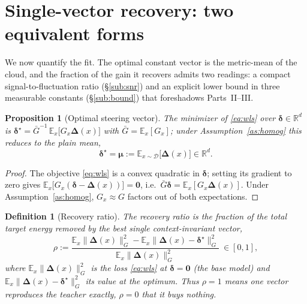\documentclass[11pt]{article}
\newtheorem{definition}{Definition}[section]
\newtheorem{proposition}{Proposition}[section]
\newcommand{\R}{\mathbb{R}}
\newcommand{\E}{\mathbb{E}}
\newcommand{\bdelta}{\bm{\delta}}
\newcommand{\bDelta}{\bm{\Delta}}
\newcommand{\bmu}{\bm{\mu}}
\newcommand{\Gnorm}[1]{\lVert #1\rVert_G}
\begin{document}
\section{Single-vector recovery: two equivalent forms}\label{sec:recovery}
We now quantify the fit. The optimal constant vector is the metric-mean of the cloud, and the
fraction of the gain it recovers admits two readings: a compact signal-to-fluctuation ratio
(\S\ref{sub:snr}) and an explicit lower bound in three measurable constants (\S\ref{sub:bound}) that
foreshadows Parts~II--III.

\begin{proposition}[Optimal steering vector]\label{prop:opt}
The minimizer of \eqref{eq:wls} over $\bdelta\in\R^d$ is
$\bdelta^\star=\bar G^{-1}\,\E_x\!\big[G_x\bDelta(x)\big]$ with $\bar G=\E_x[G_x]$; under
Assumption~\ref{as:homog} this reduces to the plain mean,
\begin{equation*}
\bdelta^\star=\bmu:=\E_{x\sim\mathcal D}\big[\bDelta(x)\big]\in\R^d .
\end{equation*}
\end{proposition}
\begin{proof}
The objective \eqref{eq:wls} is a convex quadratic in $\bdelta$; setting its gradient to zero gives
$\E_x\!\big[G_x(\bdelta-\bDelta(x))\big]=\mathbf 0$, i.e.\ $\bar G\bdelta=\E_x[G_x\bDelta(x)]$.
Under Assumption~\ref{as:homog}, $G_x\approx G$ factors out of both expectations.
\end{proof}

\begin{definition}[Recovery ratio]\label{def:rho}
The \emph{recovery ratio} is the fraction of the total target energy removed by the best single
context-invariant vector,
\begin{equation*}
\rho:=\frac{\E_x\Gnorm{\bDelta(x)}^2-\E_x\Gnorm{\bDelta(x)-\bdelta^\star}^2}
{\E_x\Gnorm{\bDelta(x)}^2}\ \in[0,1],
\end{equation*}
where $\E_x\Gnorm{\bDelta(x)}^2$ is the loss \eqref{eq:wls} at $\bdelta=\mathbf 0$ (the base model)
and $\E_x\Gnorm{\bDelta(x)-\bdelta^\star}^2$ its value at the optimum. Thus $\rho=1$ means one
vector reproduces the teacher exactly, $\rho=0$ that it buys nothing.
\end{definition}
\end{document}
